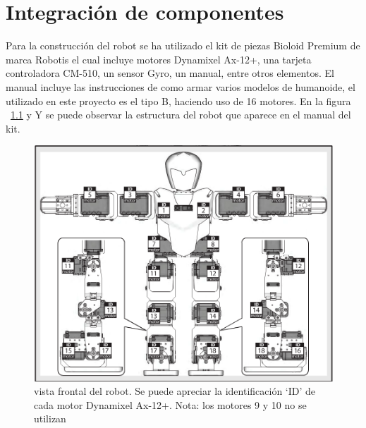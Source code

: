 \chapter{Integración de componentes}\label{chapter:Integracion_de_componentes}

Para la construcción del robot se ha utilizado el kit de piezas Bioloid Premium de marca Robotis el cual incluye motores Dynamixel Ax-12+, una tarjeta controladora CM-510, un sensor Gyro, un manual, entre otros elementos. El manual incluye las instrucciones de como armar varios modelos de humanoide, el utilizado en este proyecto es el tipo B, haciendo uso de 16 motores. En la figura ~\ref{fig:frontal} y Y se puede observar la estructura del robot que aparece en el manual del kit. 


\begin{figure}[hbtp]
\centering
\includegraphics[scale=0.3]{imagenes/Robot.png}
\caption{vista frontal del robot. Se puede apreciar la identificación ‘ID’ de cada motor Dynamixel Ax-12+. Nota: los motores 9 y 10 no se utilizan}
\label{fig:frontal}
\end{figure}

